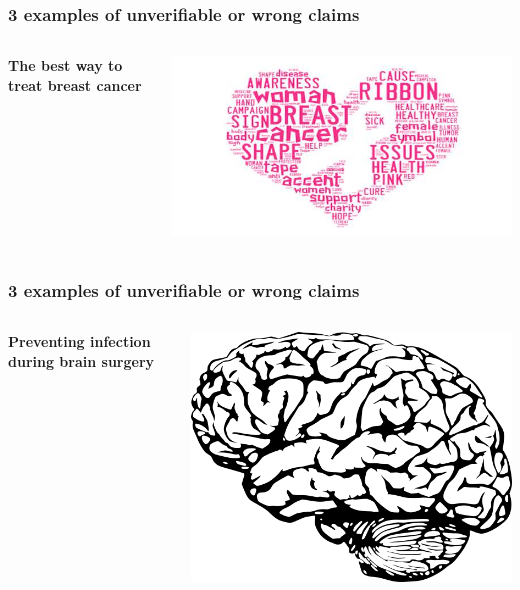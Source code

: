 \documentclass[xcolor=dvipsnames]{beamer}
\begin{document}
\begin{frame}
\frametitle{3 examples of unverifiable or wrong claims}
\begin{columns}
\begin{column}{0.5\linewidth}
{\Large \bf The best way to treat breast cancer}
\end{column}
\begin{column}{0.5\linewidth}
\includegraphics[width=0.9\linewidth]{figures/breast-cancer-dp.jpg}
\end{column}
\end{columns}
\end{frame}

\begin{frame}
\frametitle{3 examples of unverifiable or wrong claims}
\begin{columns}
\begin{column}{0.5\linewidth}
{\Large \bf Preventing infection during brain surgery}
\end{column}
\begin{column}{0.5\linewidth}
\includegraphics[width=0.9\linewidth]{figures/brain-icon-03.png}
\end{column}
\end{columns}
\end{frame}
\end{document}
